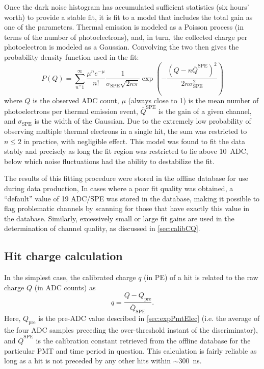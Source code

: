\documentclass[../thesis.tex]{subfiles}
\begin{document}
Once the dark noise histogram has accumulated sufficient statistics (six hours' worth) to provide a stable fit, it is fit to a model that includes the total gain as one of the parameters. Thermal emission is modeled as a Poisson process (in terms of the number of photoelectrons), and, in turn, the collected charge per photoelectron is modeled as a Gaussian. Convolving the two then gives the probability density function used in the fit:
\begin{equation*}
  P(Q) = \sum_{n^=1}^{\infty} \frac{\mu^n e^{-\mu}}{n!} \frac{1}{\sigma_{\mathrm{SPE}}\sqrt{2n\pi}} \exp\left(-\frac{(Q - n\overline Q^{\mathrm{SPE}})^2}{2n\sigma_{\mathrm{SPE}}^2}\right)
\end{equation*}
where $Q$ is the observed ADC count, $\mu$ (always close to 1) is the mean number of photoelectrons per thermal emission event, $\overline Q^{\mathrm{SPE}}$ is the gain of a given channel, and $\sigma_{\mathrm{SPE}}$ is the width of the Gaussian. Due to the extremely low probability of observing multiple thermal electrons in a single hit, the sum was restricted to $n \le 2$ in practice, with negligible effect. This model was found to fit the data stably and precisely as long the fit region was restricted to lie above 10~ADC, below which noise fluctuations had the ability to destabilize the fit.

The results of this fitting procedure were stored in the offline database for use during data production, In cases where a poor fit quality was obtained, a ``default'' value of 19 ADC/SPE was stored in the database, making it possible to flag problematic channels by scanning for those that have exactly this value in the database. Similarly, excessively small or large fit gains are used in the determination of channel quality, as discussed in \autoref{sec:calibCQ}.

\subsection{Hit charge calculation}
\label{sec:calibHitCharge}

In the simplest case, the calibrated charge $q$ (in PE) of a hit is related to the raw charge $Q$ (in ADC counts) as
\begin{equation}
  \label{eq:corrChg}
  q = \frac{Q - Q_{\mathrm{pre}}}{\overline Q_{\mathrm{SPE}}}.
\end{equation}
Here, $Q_{\mathrm{pre}}$ is the pre-ADC value described in \autoref{sec:expPmtElec} (i.e. the average of the four ADC samples preceding the over-threshold instant of the discriminator), and $\overline Q^{\mathrm{SPE}}$ is the calibration constant retrieved from the offline database for the particular PMT and time period in question. This calculation is fairly reliable as long as a hit is not preceded by any other hits within $\sim$300~ns.
\end{document}
